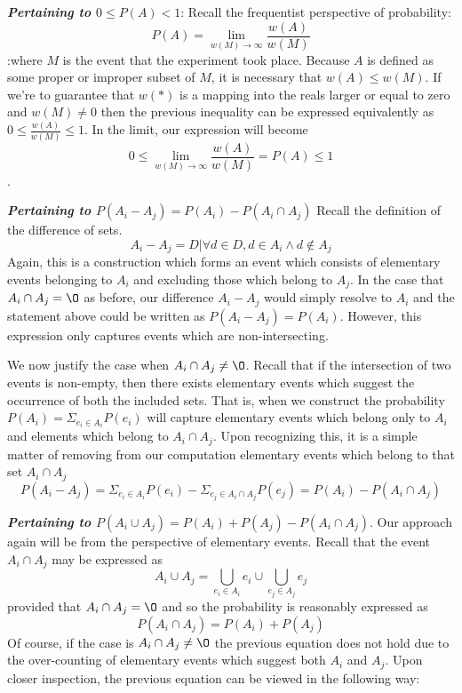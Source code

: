 \documentclass{article}
\begin{document}
\textbf{\textit{Pertaining to \(0 \leq P(A) < 1\)}}: Recall the frequentist perspective of probability:
\[P(A) = \lim_{w(M) \to \infty} \frac{w(A)}{w(M)}\]
:where \(M\) is the event that the experiment took place. Because \(A\) is defined as some proper or improper subset of \(M\), it is necessary that \(w(A) \leq w(M)\). If we're to guarantee that \(w(*)\) is a mapping into the reals larger or equal to zero and \(w(M) \neq 0\) then the previous inequality can be expressed equivalently as \(0 \leq \frac{w(A)}{w(M)} \leq 1\). In the limit, our expression will become \[0 \leq \lim_{w(M) \to \infty} \frac{w(A)}{w(M)} = P(A) \leq 1\].

\textbf{\textit{Pertaining to \(P(A_i - A_j) = P(A_i) - P(A_i \cap A_j)\)}} Recall the definition of the difference of sets.
\[A_i - A_j = D | \forall d \in D, d \in A_i \land d \notin A_j\]
Again, this is a construction which forms an event which consists of elementary events belonging to \(A_i\) and excluding those which belong to \(A_j\). In the case that \(A_i \cap A_j = \O\) as before, our difference \(A_i - A_j\) would simply resolve to \(A_i\) and the statement above could be written as \(P(A_i - A_j) = P(A_i)\). However, this expression only captures events which are non-intersecting.

We now justify the case when \(A_i \cap A_j \neq \O\). Recall that if the intersection of two events is non-empty, then there exists elementary events which suggest the occurrence of both the included sets. That is, when we construct the probability \(P(A_i) = \Sigma_{e_i \in A_i} P(e_i)\) will capture elementary events which belong only to \(A_i\) and elements which belong to \(A_i \cap A_j\). Upon recognizing this, it is a simple matter of removing from our computation elementary events which belong to that set \(A_i \cap A_j\)
\[P(A_i - A_j) = \Sigma_{e_i \in A_i} P(e_i) - \Sigma_{e_j \in A_i \cap A_j} P(e_j) = P(A_i) - P(A_i \cap A_j)\]

\textbf{\textit{Pertaining to \(P(A_i \cup A_j) = P(A_i) + P(A_j) - P(A_i \cap A_j)\)}}. Our approach again will be from the perspective of elementary events. Recall that the event \(A_i \cap A_j\) may be expressed as
\[A_i \cup A_j = \bigcup_{e_i \in A_i}e_i \cup \bigcup_{e_j \in A_j}e_j\]
provided that \(A_i \cap A_j = \O\) and so the probability is reasonably expressed as \[P(A_i \cap A_j) = P(A_i) + P(A_j)\]
Of course, if the case is \(A_i \cap A_j \neq \O\) the previous equation does not hold due to the over-counting of elementary events which suggest both \(A_i\) and \(A_j\). Upon closer inspection, the previous equation can be viewed in the following way:
\end{document}
